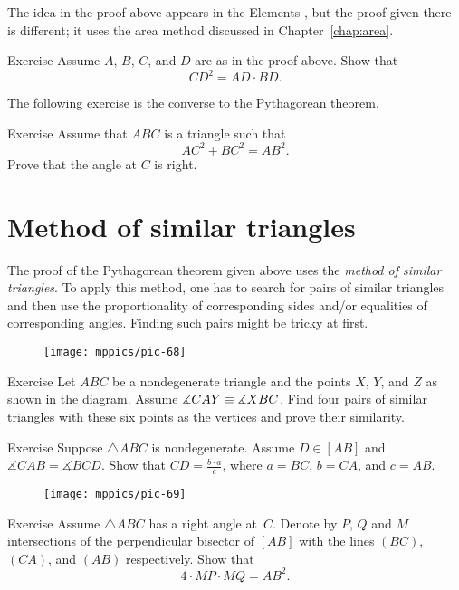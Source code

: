 The idea in the proof above appears in the Elements \cite[X.33]{euclid},
but the proof given there \cite[I.47]{euclid} is different; 
it uses the area method discussed in Chapter~\ref{chap:area}.


\begin{thm}{Exercise}\label{ex:pyth}
Assume $A$, $B$, $C$, and $D$ are as in the proof above.
Show that 
$$CD^2=AD\cdot BD.$$

\end{thm}

The following exercise is the converse to the Pythagorean theorem.

\begin{thm}{Exercise}\label{ex:pyth-conv}
Assume that $ABC$ is a triangle such that
$$AC^2+BC^2=AB^2.$$ 
Prove that the angle at $C$ is right.
\end{thm}


\section{Method of similar triangles}

The proof of the Pythagorean theorem given above uses the {}\emph{method of similar triangles}.
To apply this method, one has to search for pairs of similar triangles and then use the proportionality of corresponding sides and/or equalities of corresponding angles.
Finding such pairs might be tricky at first. 

{

\begin{wrapfigure}{r}{25mm}
\vskip-6mm
\centering
\texttt{[image: mppics/pic-68]}
\end{wrapfigure}


\begin{thm}{Exercise}\label{ex:two-pairs-sim}
Let $ABC$ be a nondegenerate triangle and the points $X$, $Y$, and $Z$ as shown in the diagram.
Assume $\measuredangle CAY\equiv\measuredangle XBC$.
Find four pairs of similar triangles with these six points as the vertices
and prove their similarity.
\end{thm}

}

\begin{thm}{Exercise}\label{ex:ABC+D}
Suppose $\triangle ABC$ is nondegenerate.
Assume $D\in [AB]$ and $\measuredangle CAB=\measuredangle BCD$.
Show that $CD=\tfrac{b\cdot a}c$, where $a=BC$, $b=CA$, and $c=AB$. 
\end{thm}

{

\begin{wrapfigure}{r}{28mm}
\vskip-8mm
\centering
\texttt{[image: mppics/pic-69]}
\end{wrapfigure}

\begin{thm}{Exercise}\label{ex:right-perp-bi}
Assume $\triangle ABC$ has a right angle at~$C$.
Denote by $P$, $Q$ and $M$ intersections of the perpendicular bisector of $[AB]$ with the lines 
$(BC)$, $(CA)$, and $(AB)$ respectively.
Show that 
\[4\cdot MP\cdot MQ=AB^2.\]

\end{thm}


}

